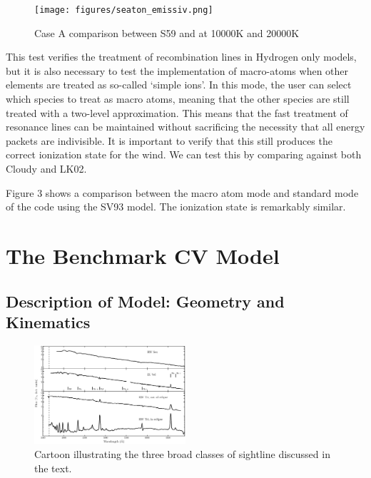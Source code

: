 \documentclass[useAMS,usenatbib, onecolumn]{mn2ejm}
\begin{document}
\begin{figure}
\centering
\texttt{[image: figures/seaton\_emissiv.png]}
\caption{Case A comparison between S59 and \py at 10000K and 20000K}
\label{seaton}
\end{figure}



This test verifies the treatment of recombination lines in Hydrogen only models, but it is also necessary to test the implementation
of macro-atoms when other elements are treated as so-called `simple ions'. In this mode, the user can select which species to treat as
macro atoms, meaning that the other species are still treated with a two-level approximation. This means that the fast treatment of
resonance lines can be maintained without sacrificing the necessity that all energy packets are indivisible. It is important to verify that 
this still produces the correct ionization state for the wind. We can test this by comparing against both {\textsc Cloudy} and LK02.

Figure 3 shows a comparison between the macro atom mode and standard mode of the code using the SV93 model. The ionization state is remarkably similar.



%
%

\section{The Benchmark CV Model}
\subsection{Description of Model: Geometry and Kinematics}
\begin{figure}
\centering
\includegraphics[width=0.5\textwidth]{figures/fig1.eps}
\caption{Cartoon illustrating the three broad classes of sightline discussed in the text.}
\label{cartoon}
\end{figure}
\end{document}
